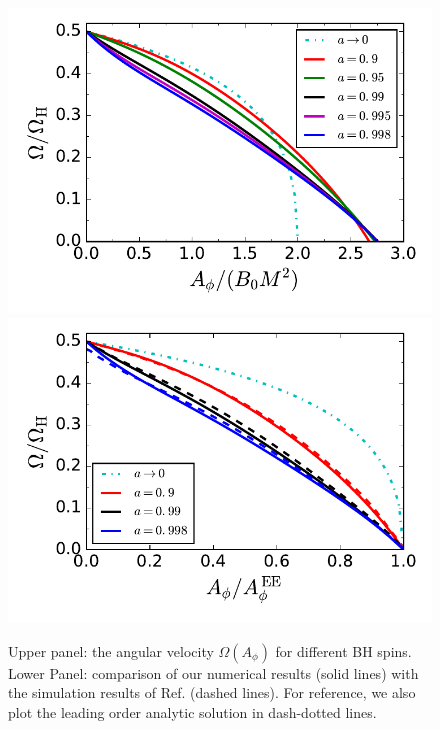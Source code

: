 \documentclass[aps,prd,reprint,nofootinbib, superscriptaddress]{revtex4-1}
\def\Ap{A_\phi}
\begin{document}
\begin{figure}
\includegraphics[scale=0.6]{f2a}
\includegraphics[scale=0.6]{f2b}
\caption{\label{fig:omega} Upper panel: the angular velocity  $\Omega(\Ap)$ for different BH spins.
Lower Panel: comparison of our numerical results (solid lines) with the simulation results of
Ref. \cite{East2018} (dashed lines). For reference, we also plot the leading order analytic solution in
dash-dotted lines.}
\end{figure}
\end{document}
